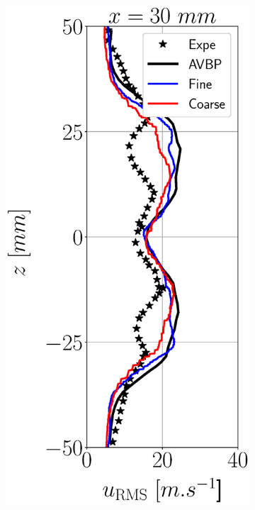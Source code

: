 \begin{figure}[h!]
\begin{subfigure}[b]{0.22\textwidth}
\end{subfigure}
   \hspace{0.05in}
\begin{subfigure}[b]{0.22\textwidth}
	\centering
   \includegraphics[scale=0.25]{./part3_applications/figures_ch7_aero/BIMER_validation_quantitative_lines/x30_u_axial_rms.eps} 

\end{subfigure}
\end{figure}
